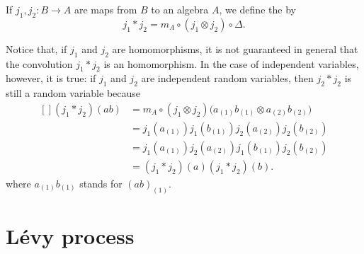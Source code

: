 If $j_1,j_2\colon B\to A$ are maps from $B$ to an algebra $A$, we define the  by
\begin{equation}
    j_1*j_2=m_A\circ(j_1\otimes j_2)\circ\Delta.
\end{equation}

Notice that, if $j_1$ and $j_2$ are homomorphisms, it is not guaranteed in general that the convolution $j_1*j_2$ is an homomorphism. In the case of independent variables, however, it is true: if $j_1$ and $j_2$ are independent random variables, then $j_2*j_2$ is still a random variable because
\begin{equation}
    \begin{aligned}[]
        (j_1*j_2)(ab)&=m_A\circ(j_1\otimes j_2)\big( a_{(1)}b_{(1)}\otimes a_{(2)}b_{(2)} \big)\\
        &=j_1(a_{(1)})j_1(b_{(1)})j_2(a_{(2)})j_2(b_{(2)})\\
        &=j_1(a_{(1)})j_2(a_{(2)})j_1(b_{(1)})j_2(b_{(2)})\\
        &=(j_1*j_2)(a)(j_1*j_2)(b).
    \end{aligned}
\end{equation}
where $a_{(1)}b_{(1)}$ stands for $(ab)_{(1)}$.

\section{Lévy process}

